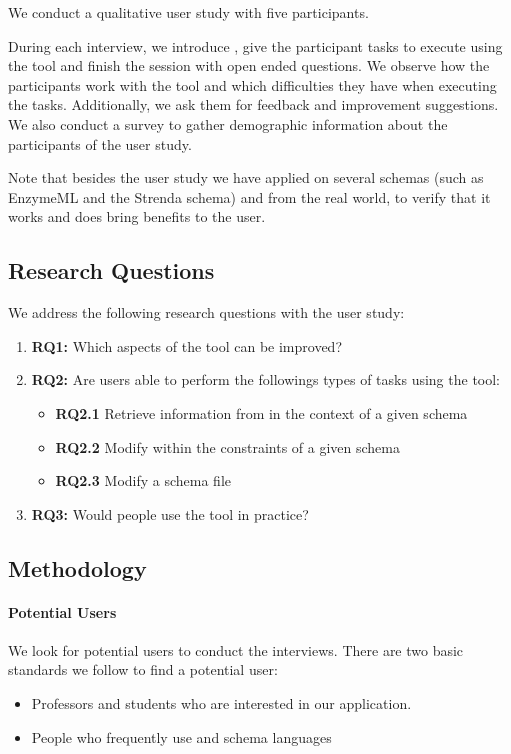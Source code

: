 We conduct a qualitative user study with five participants.

During each interview, we introduce \toolname{}, give the participant tasks to execute using the tool and finish the session with open ended questions.
We observe how the participants work with the tool and which difficulties they have when executing the tasks.
Additionally, we ask them for feedback and improvement suggestions.
We also conduct a survey to gather demographic information about the participants of the user study.

Note that besides the user study we have applied \toolname{} on several schemas (such as EnzymeML\cite{pyenzyme} and the Strenda schema\cite{strenda}) and \cfgfiles{} from the real world, to verify that it works and does bring benefits to the user.

\subsection{Research Questions}\label{subsec:research_questions}
We address the following research questions with the user study:
\begin{enumerate}
	\item \textbf{RQ1:} Which aspects of the tool can be improved?
	\item \textbf{RQ2:} Are users able to perform the followings types of tasks using the tool:
	 \begin{itemize}
			\item \textbf{RQ2.1} Retrieve information from \cfgfiles{} in the context of a given schema
			\item \textbf{RQ2.2} Modify \cfgfiles{} within the constraints of a given schema
			\item \textbf{RQ2.3} Modify a schema file
		\end{itemize}
	\item \textbf{RQ3:} Would people use the tool in practice?
\end{enumerate}

\subsection{Methodology}\label{subsec:methodology} %

\paragraph{Potential Users}
We look for potential users to conduct the interviews.
There are two basic standards we follow to find a potential user:
\begin{itemize}
    \item Professors and students who are interested in our application.
    \item People who frequently use \cfgfiles and schema languages
\end{itemize}

